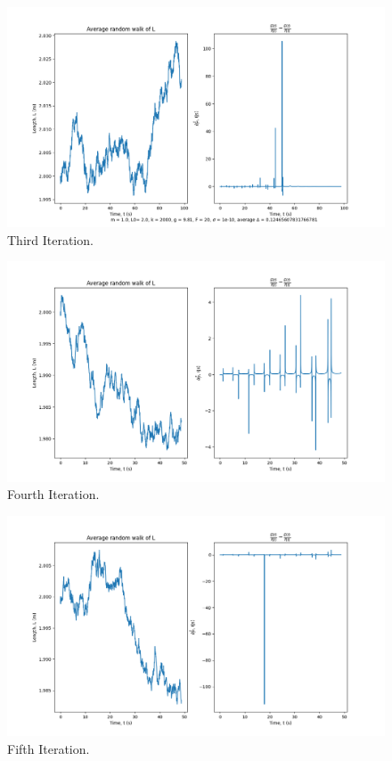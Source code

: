 \documentclass[10pt, twocolumn]{article}
\begin{document}
\begin{figure}
    \centering
    \includegraphics[width = \columnwidth]{Projects/ForcedSimplePendulum/Plots/simplified m = 1.0, L0= 2.0, k = 2000, g = 9.81, F = 20, sigma = 1e-10, run number 2.png}
    \caption{Third Iteration.}
    \label{fig:enter-label}
\end{figure}

\begin{figure}
    \centering
    \includegraphics[width = \columnwidth]{Projects/ForcedSimplePendulum/Plots/simplified m = 1.0, L0= 2.0, k = 1000, g = 9.81, F = 20, sigma = 1e-10, run number 3.png}
    \caption{Fourth Iteration.}
    \label{fig:enter-label}
\end{figure}

\begin{figure}
    \centering
    \includegraphics[width = \columnwidth]{Projects/ForcedSimplePendulum/Plots/simplified m = 1.0, L0= 2.0, k = 1000, g = 9.81, F = 20, sigma = 1e-10, run number 4.png}
    \caption{Fifth Iteration.}
    \label{fig:enter-label}
\end{figure}
\end{document}
